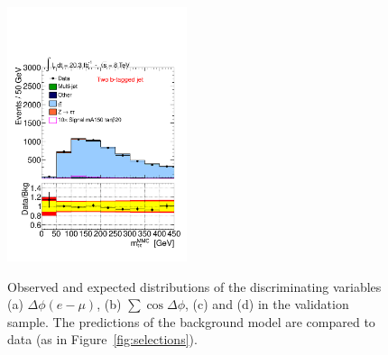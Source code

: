 \begin{figure}[htp]
\begin{center}
{            \includegraphics[page=4,width=0.47\textwidth]{figure/final_plots/twobtag.pdf}
        }

    \end{center}
    \caption{ Observed and expected distributions of the discriminating variables (a) $\Delta\phi(e-\mu)$,
      (b) $\sum\cos\Delta\phi$, (c) \SumLtMET and (d) \Ht  in the \ttbar validation sample.
	The predictions of the  background model are compared to  data (as in Figure~\ref{fig:selections}).}
 
   \label{fig:cutsttbar}
\end{figure}




